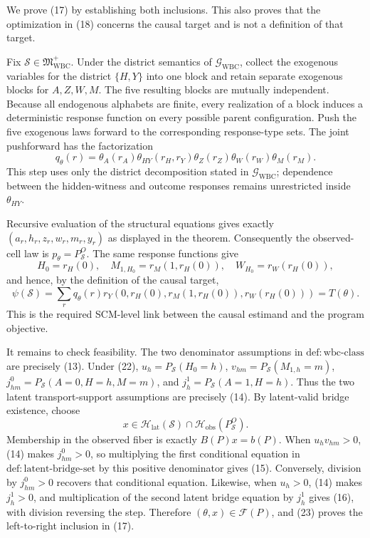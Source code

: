 We prove (17) by establishing both inclusions.  This also proves that the
optimization in (18) concerns the causal target and is not a definition of that
target.

Fix \(\mathcal S\in\mathfrak M_{\mathrm{WBC}}^{+}\).  Under the district
semantics of \(\mathcal G_{\mathrm{WBC}}\), collect the exogenous variables for
the district \(\{H,Y\}\) into one block and retain separate exogenous blocks for
\(A,Z,W,M\).  The five resulting blocks are mutually independent.  Because all
endogenous alphabets are finite, every realization of a block induces a
deterministic response function on every possible parent configuration.  Push
the five exogenous laws forward to the corresponding response-type sets.  The
joint pushforward has the factorization
\[
 q_\theta(r)=\theta_A(r_A)\theta_{HY}(r_H,r_Y)
 \theta_Z(r_Z)\theta_W(r_W)\theta_M(r_M).
 \tag{22}
\]
This step uses only the district decomposition stated in
\(\mathcal G_{\mathrm{WBC}}\); dependence between the hidden-witness and outcome
responses remains unrestricted inside \(\theta_{HY}\).

Recursive evaluation of the structural equations gives exactly
\((a_r,h_r,z_r,w_r,m_r,y_r)\) as displayed in the theorem.  Consequently the
observed-cell law is \(p_\theta=P_{\mathcal S}^O\).  The same response functions
give
\[
 H_0=r_H(0),\quad M_{1,H_0}=r_M(1,r_H(0)),\quad
 W_{H_0}=r_W(r_H(0)),
\]
and hence, by the definition of the causal target,
\[
 \psi(\mathcal S)
 =\sum_rq_\theta(r)
 r_Y(0,r_H(0),r_M(1,r_H(0)),r_W(r_H(0)))
 =T(\theta).
 \tag{23}
\]
This is the required SCM-level link between the causal estimand and the program
objective.

It remains to check feasibility.  The two denominator assumptions in
\(\mathrm{def{:}wbc\text{-}class}\) are precisely (13).  Under (22),
\(u_h=P_{\mathcal S}(H_0=h)\),
\(v_{hm}=P_{\mathcal S}(M_{1,h}=m)\),
\(j^0_{hm}=P_{\mathcal S}(A=0,H=h,M=m)\), and
\(j^1_h=P_{\mathcal S}(A=1,H=h)\).  Thus the two latent transport-support
assumptions are precisely (14).  By latent-valid bridge existence, choose
\[
 x\in\mathcal H_{\mathrm{lat}}(\mathcal S)
       \cap\mathcal H_{\mathrm{obs}}(P_{\mathcal S}^O).
\]
Membership in the observed fiber is exactly \(B(P)x=b(P)\).  When
\(u_hv_{hm}>0\), (14) makes \(j^0_{hm}>0\), so multiplying the first conditional
equation in \(\mathrm{def{:}latent\text{-}bridge\text{-}set}\) by this positive
denominator gives (15).  Conversely, division by \(j^0_{hm}>0\) recovers that
conditional equation.  Likewise, when \(u_h>0\), (14) makes \(j^1_h>0\), and
multiplication of the second latent bridge equation by \(j^1_h\) gives (16),
with division reversing the step.  Therefore \((\theta,x)\in\mathcal F(P)\),
and (23) proves the left-to-right inclusion in (17).

